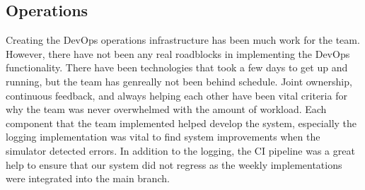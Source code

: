 \subsection{Operations}

Creating the DevOps operations infrastructure has been much work for the team. However, there have not been any real roadblocks in implementing the DevOps functionality. There have been technologies that took a few days to get up and running, but the team has genreally not been behind schedule. Joint ownership, continuous feedback, and always helping each other have been vital criteria for why the team was never overwhelmed with the amount of workload. Each component that the team implemented helped develop the system, especially the logging implementation was vital to find system improvements when the simulator detected errors. In addition to the logging, the CI pipeline was a great help to ensure that our system did not regress as the weekly implementations were integrated into the main branch.
